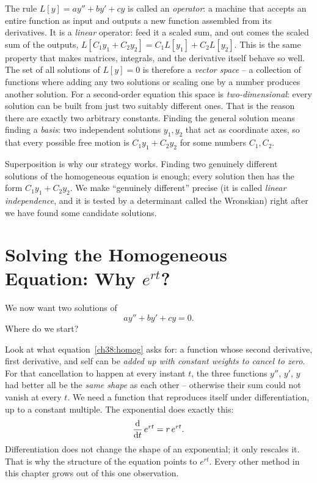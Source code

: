 \begin{happeningbox}
The rule $L[y] = a y'' + b y' + c y$ is called an \emph{operator}: a machine
that accepts an entire function as input and outputs a new function assembled
from its derivatives. It is a \emph{linear} operator: feed it a scaled sum, and
out comes the scaled sum of the
outputs, $L[C_1 y_1 + C_2 y_2] = C_1 L[y_1] + C_2 L[y_2]$. This is the same
property that makes matrices, integrals, and the derivative itself
behave so well. The set of all solutions of $L[y] = 0$ is therefore a
\emph{vector space} -- a collection of functions where adding any two solutions
or scaling one by a number produces another solution. For a second-order
equation this space is \emph{two-dimensional}: every solution can be built from
just two suitably different ones. That is the reason there are
exactly two arbitrary constants. Finding the general solution means finding a
\emph{basis}: two independent solutions $y_1, y_2$ that act as coordinate axes,
so that every possible free motion is $C_1 y_1 + C_2 y_2$ for some numbers
$C_1, C_2$.
\end{happeningbox}

\begin{whybox}
Superposition is why our strategy works. Finding two genuinely different
solutions of the homogeneous equation is enough; every solution then has
the form $C_1 y_1 + C_2 y_2$. We make ``genuinely different''
precise (it is called \emph{linear independence}, and it is tested by a
determinant called the Wronskian) right after we have found
some candidate solutions.
\end{whybox}

\section{Solving the Homogeneous Equation: Why \texorpdfstring{$e^{rt}$}{e\textasciicircum(rt)}?}
\label{ch38:characteristic}

We now want two solutions of
\begin{equation}
  a y'' + b y' + c y = 0.
  \label{ch38:homog}
\end{equation}
Where do we start?

\begin{happeningbox}
Look at what equation~\eqref{ch38:homog} asks for: a function whose second
derivative, first derivative, and self can be \emph{added up with constant weights
to cancel to zero}. For that cancellation to happen at every instant $t$, the
three functions $y''$, $y'$, $y$ had better all be the \emph{same shape} as each
other -- otherwise their sum could not vanish at every $t$. We need a function
that reproduces itself under differentiation, up to a constant multiple. The
exponential does exactly this:
\[
  \frac{\mathrm{d} }{\mathrm{d} t}\, e^{rt} = r\, e^{rt}.
\]
Differentiation does not change the shape of an exponential; it only
rescales it. That is why the structure of the equation points to $e^{rt}$.
Every other method in this chapter grows out of this one observation.
\end{happeningbox}

